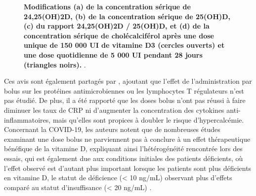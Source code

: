 \documentclass[
  a4paper,
  DIV=11,
  numbers=noendperiod,
  listof=totoc]{scrreprt}
\begin{document}
\begin{figure}


\caption[Modifications (a) de la concentration sérique de 24,25(OH)2D,
(b) de la concentration sérique de 25(OH)D, (c) du rapport 24,25(OH)2D /
25(OH)D, et (d) de la concentration sérique de cholécalciférol après une
dose unique de 150 000 UI de vitamine D3 (cercles ouverts) et une dose
quotidienne de 5 000 UI pendant 28 jours (triangles
noirs).]{\label{fig-24-hydroxylase}\textbf{Modifications (a) de la
concentration sérique de 24,25(OH)2D, (b) de la concentration sérique de
25(OH)D, (c) du rapport 24,25(OH)2D / 25(OH)D, et (d) de la
concentration sérique de cholécalciférol après une dose unique de 150
000 UI de vitamine D3 (cercles ouverts) et une dose quotidienne de 5 000
UI pendant 28 jours (triangles noirs).} \textcite{Ketha.2018}.}

\end{figure}%

Ces avis sont également partagés par \textcite{Mazess.2021}, ajoutant
que l'effet de l'administration par bolus sur les protéines
antimicrobiennes ou les lymphocytes T régulateurs n'est pas étudié. De
plus, il a été rapporté que les doses bolus n'ont pas réussi à faire
diminuer les taux de \ac{CRP} ni d'augmenter la concentration des
cytokines anti-inflammatoires, mais qu'elles sont propices à doubler le
risque d'hypercalcémie. Concernant la COVID-19, les auteurs notent que
de nombreuses études examinant une dose bolus ne parviennent pas à
conclure à un effet thérapeutique bénéfique de la vitamine D, expliquant
ainsi l'hétérogénéité rencontrée lors des essais, qui est également due
aux conditions initiales des patients déficients, où l'effet observé est
d'autant plus important lorsque les patients sont plus déficients en
vitamine D, le statut de déficience (\textless{} 10 ng/mL) observant
plus d'effets comparé au statut d'insuffisance (\textless{} 20 ng/mL)
\autocite{Mazess.2021}.
\end{document}
